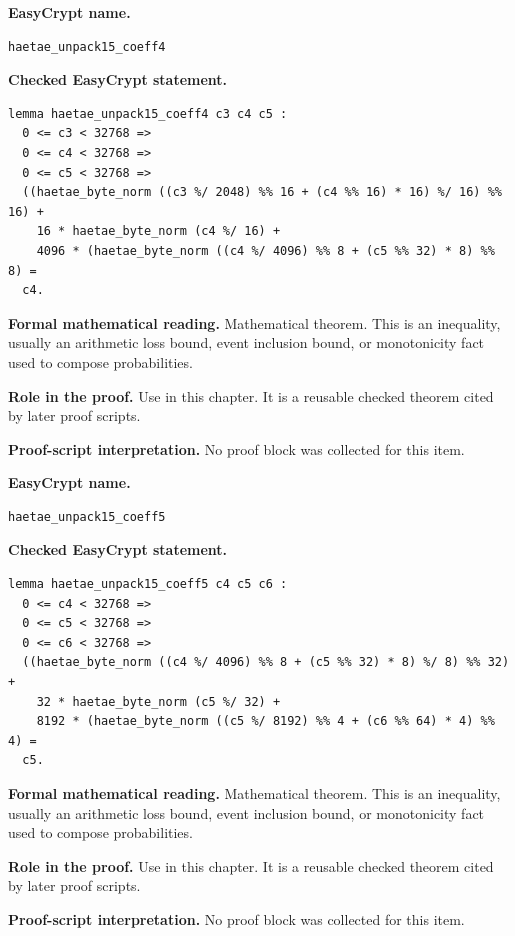 \begin{formaltheorem}
\noindent\textbf{EasyCrypt name.}
\begin{lstlisting}[language=EasyCrypt,basicstyle=\ttfamily\scriptsize]
haetae_unpack15_coeff4
\end{lstlisting}
\noindent\textbf{Checked EasyCrypt statement.}
\begin{lstlisting}[language=EasyCrypt,basicstyle=\ttfamily\scriptsize]
lemma haetae_unpack15_coeff4 c3 c4 c5 :
  0 <= c3 < 32768 =>
  0 <= c4 < 32768 =>
  0 <= c5 < 32768 =>
  ((haetae_byte_norm ((c3 %/ 2048) %% 16 + (c4 %% 16) * 16) %/ 16) %% 16) +
    16 * haetae_byte_norm (c4 %/ 16) +
    4096 * (haetae_byte_norm ((c4 %/ 4096) %% 8 + (c5 %% 32) * 8) %% 8) =
  c4.
\end{lstlisting}
\noindent\textbf{Formal mathematical reading.}
Mathematical theorem. This is an inequality, usually an arithmetic loss bound, event inclusion bound, or monotonicity fact used to compose probabilities.

\noindent\textbf{Role in the proof.}
Use in this chapter. It is a reusable checked theorem cited by later proof scripts.

\noindent\textbf{Proof-script interpretation.}
No proof block was collected for this item.

\end{formaltheorem}

\begin{formaltheorem}
\noindent\textbf{EasyCrypt name.}
\begin{lstlisting}[language=EasyCrypt,basicstyle=\ttfamily\scriptsize]
haetae_unpack15_coeff5
\end{lstlisting}
\noindent\textbf{Checked EasyCrypt statement.}
\begin{lstlisting}[language=EasyCrypt,basicstyle=\ttfamily\scriptsize]
lemma haetae_unpack15_coeff5 c4 c5 c6 :
  0 <= c4 < 32768 =>
  0 <= c5 < 32768 =>
  0 <= c6 < 32768 =>
  ((haetae_byte_norm ((c4 %/ 4096) %% 8 + (c5 %% 32) * 8) %/ 8) %% 32) +
    32 * haetae_byte_norm (c5 %/ 32) +
    8192 * (haetae_byte_norm ((c5 %/ 8192) %% 4 + (c6 %% 64) * 4) %% 4) =
  c5.
\end{lstlisting}
\noindent\textbf{Formal mathematical reading.}
Mathematical theorem. This is an inequality, usually an arithmetic loss bound, event inclusion bound, or monotonicity fact used to compose probabilities.

\noindent\textbf{Role in the proof.}
Use in this chapter. It is a reusable checked theorem cited by later proof scripts.

\noindent\textbf{Proof-script interpretation.}
No proof block was collected for this item.

\end{formaltheorem}

